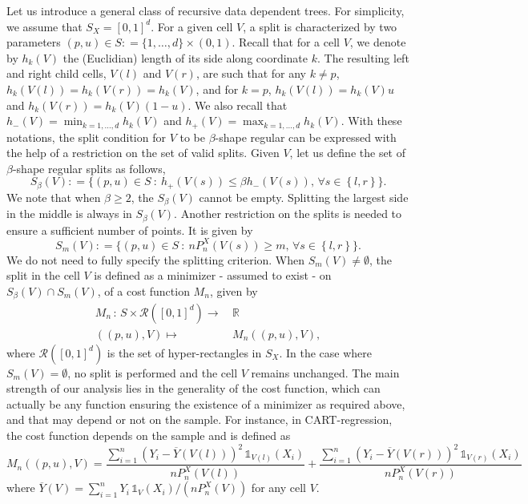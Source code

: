 \documentclass[paper=a4, fontsize=11pt]{scrartcl}
\newcommand{\ind}{\mathds{1}}
\begin{document}
Let us introduce a general class of recursive data dependent trees. For simplicity, we assume that  $S_X = [0,1]^d$. 
For a given cell $V$, a split is characterized by two parameters $(p, u) \in S : = \{ 1,\ldots, d\}\times  (0,1)$. Recall that for a cell $V$, we denote by $h_k(V)$ the (Euclidian) length of its side along coordinate $k$. The resulting left and right child cells, $V(l)$  and $V(r)$, are such that for any $k \neq p$, $h_k(V(l))=h_k(V(r))  = h _k (V) $, and for $k=p$, $ h_k(V(l)) = h_k(V) u$ and $ h_k(V(r)) = h_k(V) (1-u) $. We also recall that $h_-(V) = \min_{k = 1,\ldots, d} h_k(V) $ and $h_+(V) = \max_{k = 1,\ldots, d} h_k(V) $.  With these notations, the split condition for $V$ to be $\beta$-shape regular can be expressed with the help of a restriction on the set of valid splits. Given $V$, let us define the set of $\beta$-shape regular splits as follows,
$$ S_\beta(V) : = \{  (p,u)  \in S  \  : \  h_+( V(s)) \leq \beta h_-( V(s)),\,  \forall s  \in \left\{ l,r \right\}   \}. $$
We note that when $\beta \geq 2$, the  $S_\beta(V)$ cannot be empty. Splitting the largest side in the middle is always in $ S_\beta(V) $. Another restriction on the splits is needed to ensure a sufficient number of points. It is given by
$$ S_m(V) : = \{  (p,u) \in S  \  : \  n P_n^X( V(s) ) \geq m , \, \forall s  \in \left\{ l,r \right\}   \} .$$
We do not need to fully specify the splitting criterion. When $S_m(V)\neq \emptyset$, the split in the cell $V$ is defined as a minimizer - assumed to exist - on $S_\beta(V)  \cap S_m(V)$, of a cost function $M_n$, given by
\begin{align*}
    M_n\, : \, S \times \mathcal R ([0,1]^d)  \to &\, \mathbb R \\
    ((p,u), V) \mapsto &\,  M_n ((p,u), V),
\end{align*}
where $ \mathcal R ([0,1]^d)$ is the set of hyper-rectangles in $S_X$. In the case where $S_m(V) = \emptyset$, no split is performed and the cell $V$ remains unchanged. The main strength of our analysis lies in the generality of the cost function, which can actually be any function ensuring the existence of a minimizer as required above, and that may depend or not on the sample. For instance, in CART-regression, the cost function depends on the sample and is defined as
$$ M_n ((p,u), V) = \frac{\sum_{i=1}^n (Y_i - \overline Y( V(l))) ^2 \, \ind_{V(l)}(X_i)}{n P_n^X (V(l) )  }  + \frac{\sum_{i=1}^n (Y_i - \overline Y(V(r)))^2 \, \ind_{V(r)}(X_i)}{n P_n^X(V(r) )   } $$
where $ \overline Y(V )= \sum_{i=1}^n Y_i \, \ind_{V}(X_i) / (n P_n^X (V ))$ for any cell $V$. 
\end{document}
